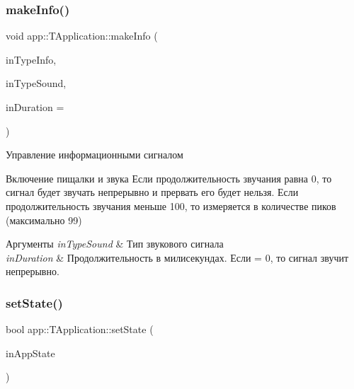 \subsubsection{\texorpdfstring{make\+Info()}{makeInfo()}}
{\footnotesize\ttfamily void app\+::\+T\+Application\+::make\+Info (\begin{DoxyParamCaption}\item[{const \hyperlink{group___xD0_x9F_xD0_xB5_xD1_x80_xD0_xB5_xD1_x87_xD0_xB8_xD1_x81_xD0_xBB_xD0_xB5_xD0_xBD_xD0_xB8_xD1_x8F_gaf2797b8ed91d66a25b1b3b05ea7bcfc2}{app\+::type\+Info}}]{in\+Type\+Info,  }\item[{const \hyperlink{group___xD0_x9F_xD0_xB5_xD1_x80_xD0_xB5_xD1_x87_xD0_xB8_xD1_x81_xD0_xBB_xD0_xB5_xD0_xBD_xD0_xB8_xD1_x8F_ga33d8f1a04a907b6c65c5dfc88280ac6f}{app\+::type\+Sound}}]{in\+Type\+Sound,  }\item[{const uint32\+\_\+t}]{in\+Duration = {} }\end{DoxyParamCaption})}



Управление информационными сигналом 

Включение пищалки и звука Если продолжительность звучания равна 0, то сигнал будет звучать непрерывно и прервать его будет нельзя. Если продолжительность звучания меньше 100, то измеряется в количестве пиков (максимально 99) 
\begin{DoxyParams}{Аргументы}
{\em in\+Type\+Sound} & Тип звукового сигнала \\
\hline
{\em in\+Duration} & Продолжительность в милисекундах. Если = 0, то сигнал звучит непрерывно. \\
\hline
\end{DoxyParams}
\mbox{\label{classapp_1_1_t_application_a3df1835103a3ba338821c27ad05f9f8d}} 
\subsubsection{\texorpdfstring{set\+State()}{setState()}}
{\footnotesize\ttfamily bool app\+::\+T\+Application\+::set\+State (\begin{DoxyParamCaption}\item[{\hyperlink{group___xD0_x9F_xD0_xB5_xD1_x80_xD0_xB5_xD1_x87_xD0_xB8_xD1_x81_xD0_xBB_xD0_xB5_xD0_xBD_xD0_xB8_xD1_x8F_ga290e8080c661e52c2f685fd4af148acf}{app\+::app\+State}}]{in\+App\+State }\end{DoxyParamCaption})}



